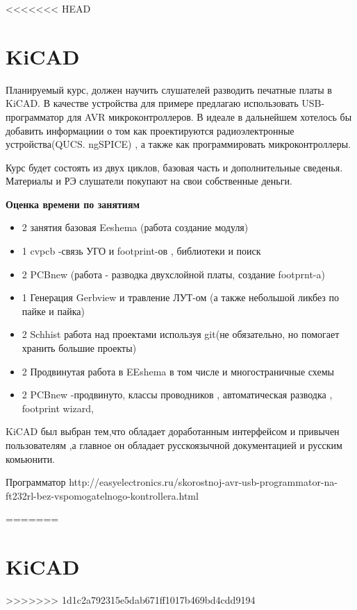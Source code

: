<<<<<<< HEAD
\part{KiCAD}

Планируемый курс, должен научить слушателей разводить печатные платы в
KiCAD. В качестве устройства для примере предлагаю использовать
USB-программатор для AVR микроконтроллеров. В идеале в дальнейшем
хотелось бы добавить информациии о том как проектируются
радиоэлектронные устройства(QUCS. ngSPICE) , а также как
программировать микроконтроллеры.

Курс будет состоять из двух циклов, базовая часть и дополнительные сведенья. 
Материалы и РЭ слушатели покупают на свои собственные деньги. 

\textbf{Оценка времени по занятиям}
\begin{itemize}
\item 2 занятия базовая Eeshema (работа создание модуля)

\item 1 cvpcb -связь УГО и footprint-ов , библиотеки и поиск

\item 2 PCBnew (работа - разводка двухслойной платы, создание
  footprnt-a)

\item 1 Генерация Gerbview и травление ЛУТ-ом (а также небольшой
  ликбез по пайке и пайка)

\item 2 Schhist работа над проектами используя git(не обязательно, но
  помогает хранить большие проекты)

\item 2 Продвинутая работа в EEshema в том числе и многостраничные
  схемы

\item 2 PCBnew -продвинуто, классы проводников , автоматическая
  разводка , footprint wizard,
\end{itemize}

KiCAD был выбран тем,что обладает доработанным интерфейсом и привычен пользователям ,а главное он обладает русскоязычной документацией и русским комьюнити.

Программатор
http://easyelectronics.ru/skorostnoj-avr-usb-programmator-na-ft232rl-bez-vspomogatelnogo-kontrollera.html
 
=======
\part{KiCAD}\label{kicad}
>>>>>>> 1d1c2a792315e5dab671ff1017b469bd4cdd9194
